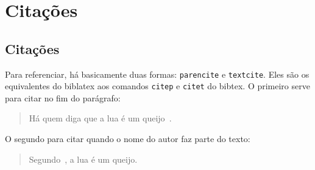 
\section{Citações}
\subsection{Citações}

Para referenciar, há basicamente duas formas: \texttt{parencite} e
\texttt{textcite}. Eles são os equivalentes do biblatex aos comandos
\texttt{citep} e \texttt{citet} do bibtex. O primeiro serve para citar no fim do
parágrafo:

\begin{quote}
  Há quem diga que a lua é um queijo~\parencite{book:ogata}.
\end{quote}

O segundo para citar quando o nome do autor faz parte do texto:

\begin{quote}
  Segundo~\textcite{book:ogata}, a lua é um queijo.
\end{quote}
